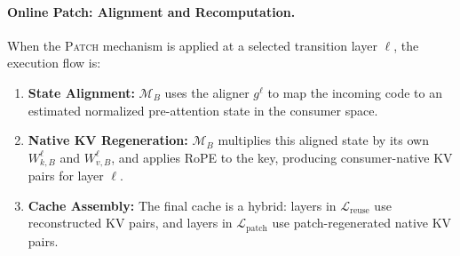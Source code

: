 \documentclass{article}
\theoremstyle{plain}
\theoremstyle{definition}
\theoremstyle{remark}
\begin{document}
\paragraph{Online Patch: Alignment and Recomputation.}
When the \textsc{Patch} mechanism is applied at a selected transition layer $\ell$, the execution flow is:
\begin{enumerate}
    \setlength{\itemsep}{1pt}
    \setlength{\parskip}{0pt}
    \setlength{\topsep}{1pt}
    \item \textbf{State Alignment:} $\mathcal{M}_B$ uses the aligner $g^\ell$ to map the incoming code to an estimated normalized pre-attention state in the consumer space.
    \item \textbf{Native KV Regeneration:} $\mathcal{M}_B$ multiplies this aligned state by its own $W_{k,B}^{\ell}$ and $W_{v,B}^{\ell}$, and applies RoPE to the key, producing consumer-native KV pairs for layer $\ell$.
    \item \textbf{Cache Assembly:} The final cache is a hybrid: layers in $\mathcal{L}_{\mathrm{reuse}}$ use reconstructed KV pairs, and layers in $\mathcal{L}_{\mathrm{patch}}$ use patch-regenerated native KV pairs.
\end{enumerate}
\end{document}
